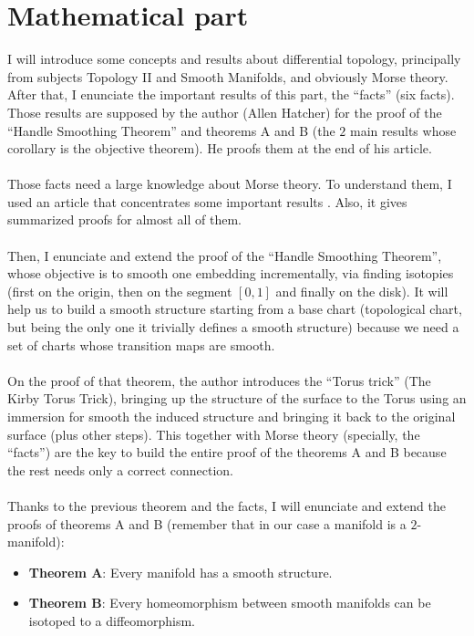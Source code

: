 \section*{Mathematical part}
I will introduce some concepts and results about differential topology, principally from subjects Topology II and Smooth Manifolds, and obviously Morse theory. After that, I enunciate the important results of this part, the ``facts'' (six facts). Those results are supposed by the author (Allen Hatcher) for the proof of the ``Handle Smoothing Theorem'' and theorems A and B (the $2$ main results whose corollary is the objective theorem). He proofs them at the end of his article.\\
\\Those facts need a large knowledge about Morse theory. To understand them, I used an article that concentrates some important results \cite{MorseTh1}. Also, it gives summarized proofs for almost all of them.\\
\\Then, I enunciate and extend the proof of the ``Handle Smoothing Theorem'', whose objective is to smooth one embedding incrementally, via finding isotopies (first on the origin, then on the segment $[0,1]$ and finally on the disk). It will help us to build a smooth structure starting from a base chart (topological chart, but being the only one it trivially defines a smooth structure) because we need a set of charts whose transition maps are smooth.\\
\\On the proof of that theorem, the author introduces the ``Torus trick'' (The Kirby Torus Trick), bringing up the structure of the surface to the Torus using an immersion for smooth the induced structure and bringing it back to the original surface (plus other steps). This together with Morse theory (specially, the ``facts'') are the key to build the entire proof of the theorems A and B because the rest needs only a correct connection.\\
\\Thanks to the previous theorem and the facts, I will enunciate and extend the proofs of theorems A and B (remember that in our case a manifold is a $2$-manifold):
\begin{itemize}
	\item \textbf{Theorem A}: Every manifold has a smooth structure.
	\item \textbf{Theorem B}: Every homeomorphism between smooth manifolds can be isotoped to a diffeomorphism.
\end{itemize}

